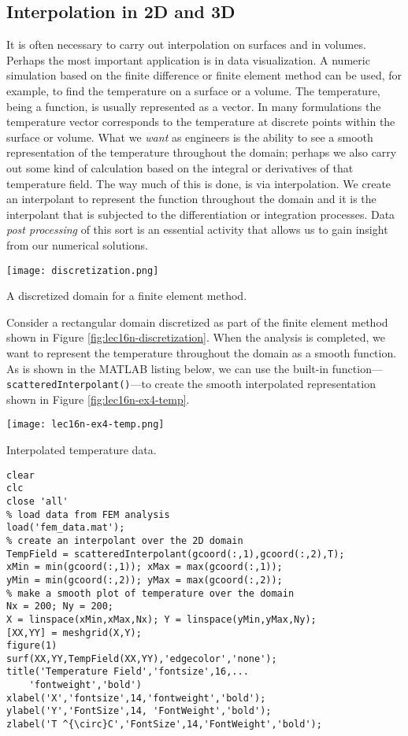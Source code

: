 \subsection{Interpolation in 2D and 3D}
It is often necessary to carry out interpolation on surfaces and in volumes.  Perhaps the most important application is in data visualization.  A numeric simulation based on the finite difference or finite element method can be used, for example, to find the temperature on a surface or a volume.  The temperature, being a function, is usually represented as a vector. In many formulations the temperature vector corresponds to the temperature at discrete points within the surface or volume.  What we \emph{want} as engineers is the ability to see a smooth representation of the temperature throughout the domain; perhaps we also carry out some kind of calculation based on the integral or derivatives of that temperature field.  The way much of this is done, is via interpolation.  We create an interpolant to represent the function throughout the domain and it is the interpolant that is subjected to the differentiation or integration processes.  Data \emph{post processing} of this sort is an essential activity that allows us to gain insight from our numerical solutions.    
\begin{marginfigure}
\texttt{[image: discretization.png]}
\caption{A discretized domain for a finite element method.}
\label{fig:lec16n-discretization}
\end{marginfigure}
Consider a rectangular domain discretized as part of the finite element method shown in Figure \ref{fig:lec16n-discretization}.  When the analysis is completed, we want to represent the temperature throughout the domain as a smooth function.  As is shown in the MATLAB listing below, we can use the built-in function---\lstinline[style=myMatlab]{scatteredInterpolant()}---to create the smooth interpolated representation shown in Figure \ref{fig:lec16n-ex4-temp}.
\begin{marginfigure}
\texttt{[image: lec16n-ex4-temp.png]}
\caption{Interpolated temperature data.}
\label{fig:lec16n-ex4-temp}
\end{marginfigure}

\begin{lstlisting}[style=myMatlab,name=lec16n-ex4]
clear
clc
close 'all'
% load data from FEM analysis
load('fem_data.mat');
% create an interpolant over the 2D domain
TempField = scatteredInterpolant(gcoord(:,1),gcoord(:,2),T);
xMin = min(gcoord(:,1)); xMax = max(gcoord(:,1));
yMin = min(gcoord(:,2)); yMax = max(gcoord(:,2));
% make a smooth plot of temperature over the domain
Nx = 200; Ny = 200;
X = linspace(xMin,xMax,Nx); Y = linspace(yMin,yMax,Ny);
[XX,YY] = meshgrid(X,Y);
figure(1)
surf(XX,YY,TempField(XX,YY),'edgecolor','none');
title('Temperature Field','fontsize',16,...
    'fontweight','bold')
xlabel('X','fontsize',14,'fontweight','bold');
ylabel('Y','FontSize',14, 'FontWeight','bold');
zlabel('T ^{\circ}C','FontSize',14,'FontWeight','bold');
\end{lstlisting}
